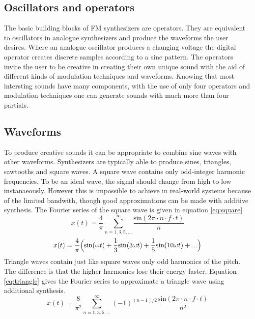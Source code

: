 \subsection{Oscillators and operators}
The basic building blocks of FM synthesizers are operators. They are equivalent to oscillators in analogue synthesizers and produce the waveforms the user desires. Where an analogue oscillator produces a changing voltage the digital operator creates discrete samples according to a sine pattern. The operators invite the user to be creative in creating their own unique sound with the aid of different kinds of modulation techniques and waveforms. Knowing that most intersting sounds have many components, with the use of only four operators and modulation techniques one can generate sounds with much more than four partials.
\subsection{Waveforms}
To produce creative sounds it can be appropriate to combine sine waves with other waveforms. Synthesizers are typically able to produce sines, triangles, sawtooths and square waves.
A square wave contains only odd-integer harmonic frequencies. To be an ideal wave, the signal should change from high to low instanaeously. However this is impossible to achieve in real-world systems because of the limited bandwith, though good approximations can be made with additive synthesis. The Fourier series of the square wave is given in equation \ref{eq:square} \\
\begin{equation}
x(t) = \frac{4}{\pi} \sum_{n=1,3,5,...}^{\infty} \frac{\mathrm{sin}(2\pi \cdot n \cdot f \cdot t)}{n}
\label{eq:square}
\end{equation}
\begin{equation}
x(t) = \frac{4}{\pi} \Bigl( \mathrm{sin}(\omega t) + \frac{1}{3} \mathrm{sin} (\mathrm{3} \omega t) + \frac{1}{5}\mathrm{sin}(\mathrm{10}\omega t) + ... \Bigr)
\label{eq:square2}
\end{equation}
Triangle waves contain just like square waves only odd harmonics of the pitch. The difference is that the higher harmonics lose their energy faster. Equation \ref{eq:triangle} gives the Fourier series to approximate a triangle wave using additional synthesis.
\begin{equation}
x(t) = \frac{8}{\pi^{2}} \sum_{n=1,3,5,...}^{\infty} (-1)^{(n-1)/2} \frac{\mathrm{sin}(2\pi \cdot n \cdot f \cdot t)}{n^{2}}
\label{eq:triangle}
\end{equation}
